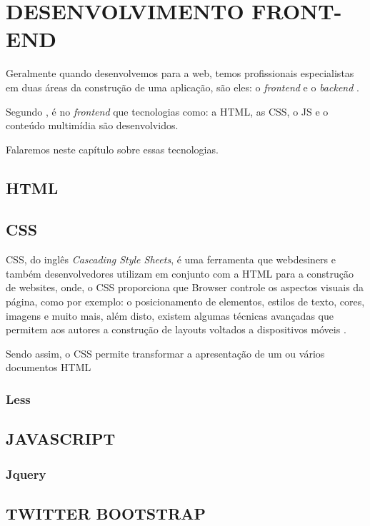 \chapter{DESENVOLVIMENTO FRONT-END}
\label{desenvolvimentoFrontEnd}

Geralmente quando desenvolvemos para a web, temos profissionais especialistas em
duas áreas da construção de uma aplicação, são eles: o \textit{frontend} e o
\textit{backend} \cite{artigoAvaliacaoEReducaoDoTempoDeRespostaDeSistemasWeb}.

Segundo , é no
\textit{frontend} que tecnologias como: a \ac{HTML}, as \ac{CSS}, o \ac{JS}
e o conteúdo multimídia são desenvolvidos.

Falaremos neste capítulo sobre essas tecnologias.

\section{HTML}
\section{CSS}

\ac{CSS}, do inglês \textit{Cascading Style Sheets}, é uma ferramenta
que webdesiners e também desenvolvedores utilizam em conjunto com a \ac{HTML} para a
construção de websites, onde, o \acs{CSS} proporciona que \ac{Browser} controle
os aspectos visuais da página, como por exemplo: o posicionamento de elementos,
estilos de texto, cores, imagens e muito mais, além disto, existem algumas
técnicas avançadas que permitem aos autores a construção de layouts voltados a
dispositivos móveis \cite{beginningCSSCascadingStyleSheetsForWebDesign}.

Sendo assim, o \acs{CSS} permite transformar a apresentação de um ou vários
documentos \acs{HTML}

\subsection{Less}
\section{JAVASCRIPT}
\subsection{Jquery}
\section{TWITTER BOOTSTRAP}

